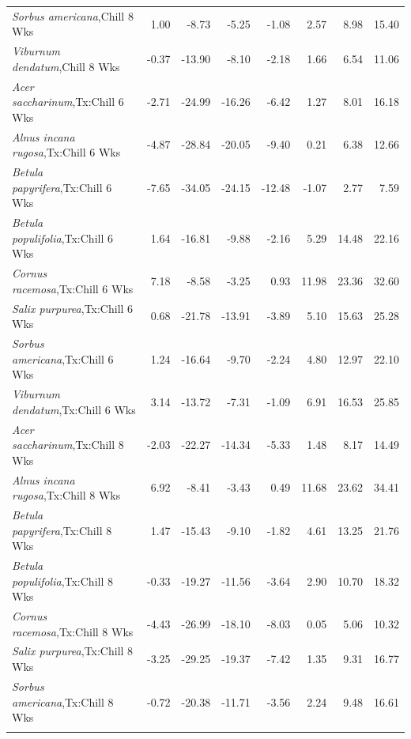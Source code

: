 \documentclass{article}\usepackage[]{graphicx}\usepackage[]{color}
\begin{document}
\begin{longtable}{lrrrrrrr}
  \textit{Sorbus americana},Chill 8 Wks & 1.00 & -8.73 & -5.25 & -1.08 & 2.57 & 8.98 & 15.40 \\ 
  \textit{Viburnum dendatum},Chill 8 Wks & -0.37 & -13.90 & -8.10 & -2.18 & 1.66 & 6.54 & 11.06 \\ 
  \textit{Acer saccharinum},Tx:Chill 6 Wks & -2.71 & -24.99 & -16.26 & -6.42 & 1.27 & 8.01 & 16.18 \\ 
  \textit{Alnus incana rugosa},Tx:Chill 6 Wks & -4.87 & -28.84 & -20.05 & -9.40 & 0.21 & 6.38 & 12.66 \\ 
  \textit{Betula papyrifera},Tx:Chill 6 Wks & -7.65 & -34.05 & -24.15 & -12.48 & -1.07 & 2.77 & 7.59 \\ 
  \textit{Betula populifolia},Tx:Chill 6 Wks & 1.64 & -16.81 & -9.88 & -2.16 & 5.29 & 14.48 & 22.16 \\ 
  \textit{Cornus racemosa},Tx:Chill 6 Wks & 7.18 & -8.58 & -3.25 & 0.93 & 11.98 & 23.36 & 32.60 \\ 
  \textit{Salix purpurea},Tx:Chill 6 Wks & 0.68 & -21.78 & -13.91 & -3.89 & 5.10 & 15.63 & 25.28 \\ 
  \textit{Sorbus americana},Tx:Chill 6 Wks & 1.24 & -16.64 & -9.70 & -2.24 & 4.80 & 12.97 & 22.10 \\ 
  \textit{Viburnum dendatum},Tx:Chill 6 Wks & 3.14 & -13.72 & -7.31 & -1.09 & 6.91 & 16.53 & 25.85 \\ 
  \textit{Acer saccharinum},Tx:Chill 8 Wks & -2.03 & -22.27 & -14.34 & -5.33 & 1.48 & 8.17 & 14.49 \\ 
  \textit{Alnus incana rugosa},Tx:Chill 8 Wks & 6.92 & -8.41 & -3.43 & 0.49 & 11.68 & 23.62 & 34.41 \\ 
  \textit{Betula papyrifera},Tx:Chill 8 Wks & 1.47 & -15.43 & -9.10 & -1.82 & 4.61 & 13.25 & 21.76 \\ 
  \textit{Betula populifolia},Tx:Chill 8 Wks & -0.33 & -19.27 & -11.56 & -3.64 & 2.90 & 10.70 & 18.32 \\ 
  \textit{Cornus racemosa},Tx:Chill 8 Wks & -4.43 & -26.99 & -18.10 & -8.03 & 0.05 & 5.06 & 10.32 \\ 
  \textit{Salix purpurea},Tx:Chill 8 Wks & -3.25 & -29.25 & -19.37 & -7.42 & 1.35 & 9.31 & 16.77 \\ 
  \textit{Sorbus americana},Tx:Chill 8 Wks & -0.72 & -20.38 & -11.71 & -3.56 & 2.24 & 9.48 & 16.61 \\ 
   \hline
\hline
\label{tab:suppmodht}
\end{longtable}
\end{document}
